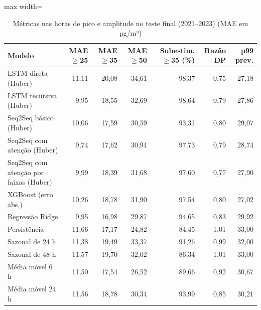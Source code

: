 \begin{table}[!htbp]
    \centering
    \caption{Métricas nas horas de pico e amplitude no teste final (2021--2023) (MAE em µg/m³)}
    \label{tab:cauda_holdout}
    \small
    \begin{adjustbox}{max width=\textwidth}
    \begin{tabular}{lrrrrrr}
        \toprule
        Modelo & MAE $\geq$25 & MAE $\geq$35 & MAE $\geq$50 & Subestim. $\geq$35 (\%) & Razão DP & p99 prev. \\
        \midrule
        LSTM direta (Huber) & 11,11 & 20,08 & 34,61 & 98,37 & 0,75 & 27,18 \\
        LSTM recursiva (Huber) & 9,95 & 18,55 & 32,69 & 98,64 & 0,79 & 27,86 \\
        Seq2Seq básico (Huber) & 10,06 & 17,59 & 30,59 & 93,31 & 0,80 & 29,07 \\
        Seq2Seq com atenção (Huber) & 9,74 & 17,62 & 30,94 & 97,73 & 0,79 & 28,74 \\
        Seq2Seq com atenção por faixas (Huber) & 9,99 & 18,39 & 31,68 & 97,60 & 0,77 & 27,90 \\
        XGBoost (erro abs.) & 10,26 & 18,78 & 31,90 & 97,54 & 0,80 & 27,02 \\
        Regressão Ridge & 9,95 & 16,98 & 29,87 & 94,65 & 0,83 & 29,92 \\
        \midrule
        Persistência & 11,66 & 17,17 & 24,82 & 84,45 & 1,01 & 33,00 \\
        Sazonal de 24 h & 11,38 & 19,49 & 33,37 & 91,26 & 0,99 & 32,00 \\
        Sazonal de 48 h & 11,57 & 19,70 & 32,02 & 86,34 & 1,01 & 33,00 \\
        Média móvel 6 h & 11,50 & 17,54 & 26,52 & 89,66 & 0,92 & 30,67 \\
        Média móvel 24 h & 11,56 & 18,78 & 30,34 & 93,99 & 0,85 & 30,21 \\
        \bottomrule
    \end{tabular}
    \end{adjustbox}
\end{table}
